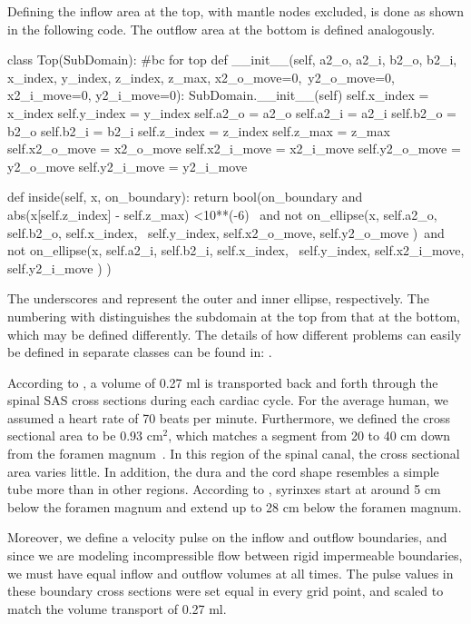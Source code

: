 Defining the inflow area at the top, with mantle nodes excluded, is done as shown in the following code. The outflow area at the bottom is defined analogously.

\begin{python}
class Top(SubDomain):	#bc for top
	def __init__(self, a2_o, a2_i, b2_o, b2_i,  x_index, y_index, z_index, z_max, x2_o_move=0,\
				 y2_o_move=0, x2_i_move=0, y2_i_move=0):
		SubDomain.__init__(self)
		self.x_index = x_index
		self.y_index = y_index
		self.a2_o = a2_o
		self.a2_i = a2_i
		self.b2_o = b2_o
		self.b2_i = b2_i
		self.z_index = z_index
		self.z_max = z_max
		self.x2_o_move = x2_o_move
		self.x2_i_move = x2_i_move
		self.y2_o_move = y2_o_move
		self.y2_i_move = y2_i_move

	def inside(self, x, on_boundary):
		return bool(on_boundary and abs(x[self.z_index] - self.z_max) <10**(-6) \
                       and not on_ellipse(x, self.a2_o, self.b2_o, self.x_index,  \
                           self.y_index, self.x2_o_move, self.y2_o_move )\
                       and not on_ellipse(x, self.a2_i, self.b2_i, self.x_index, \
                           self.y_index, self.x2_i_move, self.y2_i_move ) )
\end{python}

The underscores \emp{o} and \emp{i} represent the outer and inner
ellipse, respectively. The numbering with \emp{2} distinguishes the subdomain at the top from that at the bottom, which may be defined
differently. The details of how different problems can easily be
defined in separate classes can be found in:
. %


According to \citet{GuptaSoellingerBoesigerEtAl2009}, a volume of 0.27 ml is
transported back and forth through the spinal SAS cross sections during
each cardiac cycle. For the average human, we assumed a heart rate of 70
beats per minute. Furthermore, we defined the cross sectional area to be
0.93 $\mathrm{cm^2}$, which matches a segment from 20 to 40 cm down from
the foramen magnum~\citep{LothYardimciAlperin2001}. In this region of the
spinal canal, the cross sectional area varies little. In addition, the dura
and the cord shape resembles a simple tube more than in other regions.
According to \citet{OldfieldMuraszkoShawkerEtAl1994}, syrinxes start at
around 5 cm below the foramen magnum and extend up to 28 cm below the foramen magnum.

Moreover, we define a velocity pulse on the inflow and outflow
boundaries, and since we are modeling incompressible flow between rigid
impermeable boundaries, we must have equal inflow and outflow volumes
at all times. The pulse values in these boundary cross sections were
set equal in every grid point, and scaled to match the volume
transport of 0.27 ml.

